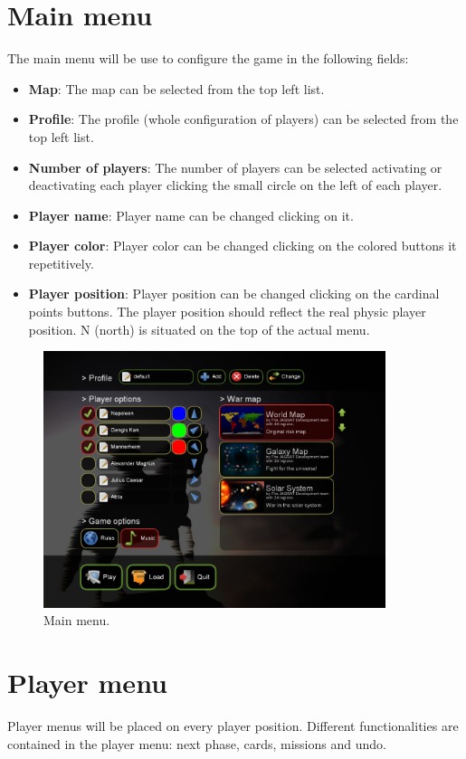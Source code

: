 \documentclass[12pt,a4paper]{article}
\begin{document}
\section{Main menu}
The main menu will be use to configure the game in the following fields:

\begin{itemize}
\item {\bf Map}: The map can be selected from the top left list.
\item {\bf Profile}: The profile (whole configuration of players) can be selected from the top left list.
\item {\bf Number of players}: The number of players can be selected activating or deactivating each player clicking the small circle on the left of each player.
\item {\bf Player name}: Player name can be changed clicking on it.
\item {\bf Player color}: Player color can be changed clicking on the colored buttons it repetitively.
\item {\bf Player position}: Player position can be changed clicking on the cardinal points buttons. The player position should reflect the real physic player position. N (north) is situated on the top of the actual menu.
\end{itemize}

\begin{figure}[h!]
\centering
\includegraphics[width=10cm]{pic/menu-screenshot.png}
\caption{Main menu.}
\label{fig:mainmenu.}
\end{figure}


\section{Player menu}
Player menus will be placed on every player position. Different functionalities are contained in the player menu: next phase, cards, missions and undo.
\end{document}
